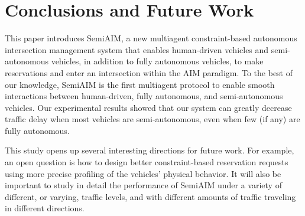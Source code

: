 \section{Conclusions and Future Work}
\label{sec:conclusions}

This paper introduces SemiAIM, a new multiagent constraint-based
autonomous intersection management system that enables human-driven
vehicles and semi-autonomous vehicles, in addition to fully autonomous
vehicles, to make reservations and enter an intersection within the
AIM paradigm.  To the best of our knowledge, SemiAIM is the first
multiagent protocol to enable smooth interactions between
human-driven, fully autonomous, and semi-autonomous vehicles.  Our
experimental results showed that our system can greatly decrease
traffic delay when most vehicles are semi-autonomous, even when few
(if any) are fully autonomous.

This study opens up several interesting directions for future work.
For example, an open question is how to design better constraint-based
reservation requests using more precise profiling of the vehicles'
physical behavior.  It will also be important to study in detail the
performance of SemiAIM under a variety of different, or varying,
traffic levels, and with different amounts of traffic traveling in
different directions.










